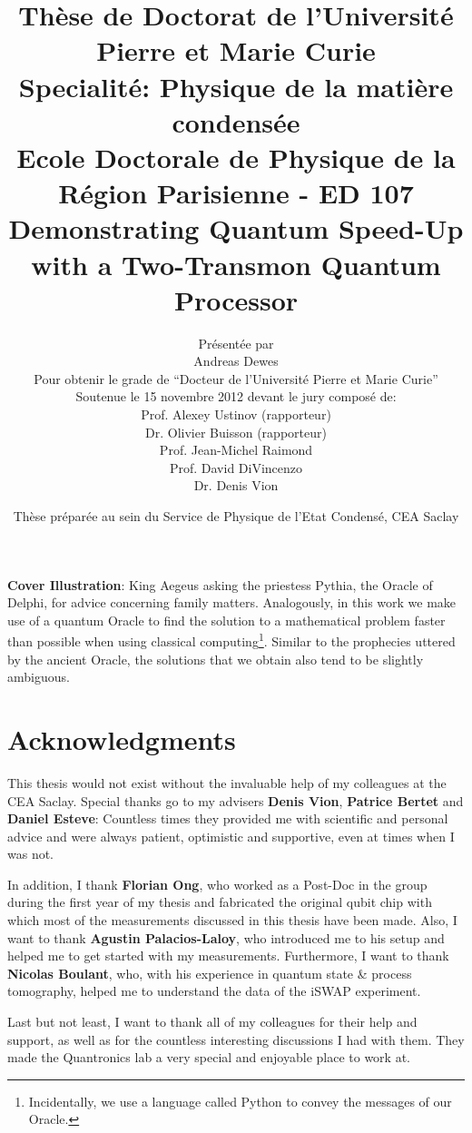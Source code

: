 \documentclass[12pt,twoside]{book}
\title{\normalsize Thèse de Doctorat de l'Université Pierre et Marie Curie \\ Specialité: Physique de la matière condensée \\ Ecole Doctorale de Physique de la Région Parisienne - ED 107 \bigskip \\ \huge Demonstrating Quantum Speed-Up with a Two-Transmon Quantum Processor}
\author{Présentée par \bigskip \\ \bigskip \huge Andreas Dewes \\ \small Pour obtenir le grade de ``Docteur de l'Université Pierre et Marie Curie'' \vspace{3cm} \\ Soutenue le 15 novembre 2012 devant le jury composé de: \\ Prof. Alexey Ustinov (rapporteur) \\ Dr. Olivier Buisson (rapporteur) \\ Prof. Jean-Michel Raimond \\ Prof. David DiVincenzo \\ Dr. Denis Vion}
\date{\vspace{2cm} Thèse préparée au sein du Service de Physique de l'Etat Condensé, CEA Saclay}
\newif\ifanimate
\theoremstyle{definition}
\begin{document}
\pagestyle{plain}


\ifanimate

\else

\fi

\maketitle

\thispagestyle{empty}

{\small
\textbf{Cover Illustration}: King Aegeus asking the priestess Pythia, the Oracle of Delphi, for advice concerning family matters. Analogously, in this work we make use of a quantum Oracle to find the solution to a mathematical problem faster than possible when using classical computing\footnote{Incidentally, we use a language called Python to convey the messages of our Oracle.}. Similar to the prophecies uttered by the ancient Oracle, the solutions that we obtain also tend to be slightly ambiguous.}


\chapter*{Acknowledgments}

This thesis would not exist without the invaluable help of my colleagues at the CEA Saclay. Special thanks go to my advisers \textbf{Denis Vion}, \textbf{Patrice Bertet} and \textbf{Daniel Esteve}: Countless times they provided me with scientific and personal advice and were always patient, optimistic and supportive, even at times when I was not.

\smallskip

In addition, I thank \textbf{Florian Ong}, who worked as a Post-Doc in the group during the first year of my thesis and fabricated the original qubit chip with which most of the measurements discussed in this thesis have been made. Also, I want to thank \textbf{Agustin Palacios-Laloy}, who introduced me to his setup and helped me to get started with my measurements. Furthermore, I want to thank \textbf{Nicolas Boulant}, who, with his experience in quantum state \& process tomography, helped me to understand the data of the iSWAP experiment.

\smallskip

Last but not least, I want to thank all of my colleagues for their help and support, as well as for the countless interesting discussions I had with them. They made the Quantronics lab a very special and enjoyable place to work at.
\end{document}
